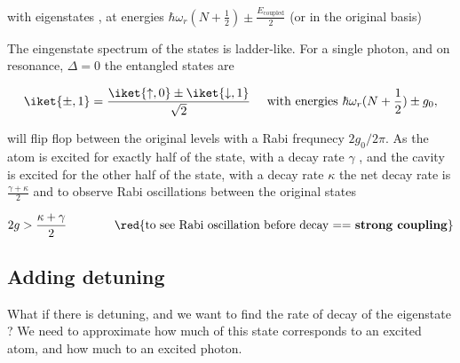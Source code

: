 \begin{itemize}
 \noindent with eigenstates ,  at energies $ \hbar\omega_r(N+\frac{1}{2}) \pm \frac{E_\text{coupled}}{2} $ (or in the original basis)
 \iframe{
 \[
 	 \begin{aligned}
 	 \iket{+,N} & = U^{\dagger}\ket{\tilde{1}} 				= \bigg(\cos(\theta/2)\mathbb{I}-i\sin(\theta/2)\sigma_y\bigg)
 				\begin{pmatrix}1\\0 \end{pmatrix} = 
 				\begin{pmatrix} \cos(\theta/2)\\\sin(\theta/2)\end{pmatrix} \\
 	\iket{-,N} & = U^{\dagger}\ket{\tilde{0}} = \begin{pmatrix}
 	-\sin(\theta/2)\\\cos(\theta/2)
 	\end{pmatrix} \equiv -\sin(\theta/2)\iket{\uparrow,N} + \cos(\theta/2)\iket{\downarrow,N+1}\\
 	\\&\text{Energies}_{\pm} = \hbar\omega_r(N+\frac{1}{2}) \pm \frac{E_\text{coupled}}{2}
 	\end{aligned}
 \]}
 \end{itemize}
 
 
 The eingenstate spectrum of the  states is ladder-like.  For a single photon, and on resonance, $ \Delta = 0 $ the entangled states are
 
 \[
 	\iket{\pm,1} = \frac{\iket{\uparrow,0} \pm \iket{\downarrow,1}}{\sqrt{2}} \quad \text{ with energies } \hbar\omega_r(N+\frac{1}{2}) \pm g_0,
 \]
 
 \noindent will flip flop between the original levels with a Rabi frequnecy $ 2g_0/2\pi $. As the atom is excited for exactly half of the state, with a decay rate $ \gamma $ , and the cavity is excited for the other half of the state, with a decay rate $ \kappa $ the net decay rate is $ \frac{\gamma+\kappa}{2} $ and to observe Rabi oscillations between the original states
 
 \[
 	2g > \frac{\kappa+\gamma}{2} \qquad\qquad\text{\red{to see Rabi oscillation before decay == \textbf{strong coupling}}}
 \]
 
 \subsection{Adding detuning}
 \alert{What if there is detuning, and we want to find the rate of decay of the eigenstate ? We need to approximate how much of this state corresponds to an excited atom, \iup and how much to an excited photon.} 
 
